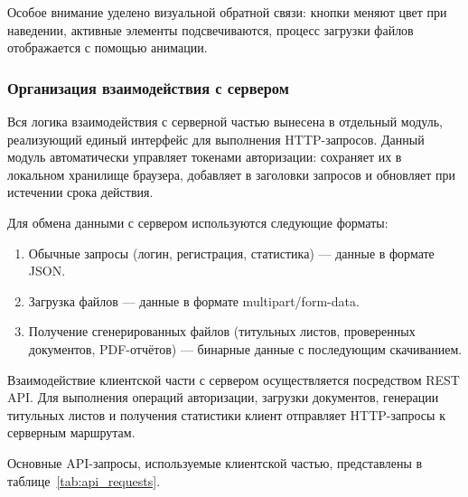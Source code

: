 Особое внимание уделено визуальной обратной связи: кнопки меняют цвет при наведении, активные элементы подсвечиваются, процесс загрузки файлов отображается с помощью анимации.

\subsubsection{Организация взаимодействия с сервером}

Вся логика взаимодействия с серверной частью вынесена в отдельный модуль, реализующий единый интерфейс для выполнения HTTP-запросов. Данный модуль автоматически управляет токенами авторизации: сохраняет их в локальном хранилище браузера, добавляет в заголовки запросов и обновляет при истечении срока действия.

Для обмена данными с сервером используются следующие форматы:

\begin{enumerate}
	\item Обычные запросы (логин, регистрация, статистика) — данные в формате JSON.
	\item Загрузка файлов — данные в формате multipart/form-data.
	\item Получение сгенерированных файлов (титульных листов, проверенных документов, PDF-отчётов) — бинарные данные с последующим скачиванием.
\end{enumerate}

Взаимодействие клиентской части с сервером осуществляется посредством REST API. Для выполнения операций авторизации, загрузки документов, генерации титульных листов и получения статистики клиент отправляет HTTP-запросы к серверным маршрутам.

Основные API-запросы, используемые клиентской частью, представлены в таблице~\ref{tab:api_requests}.

